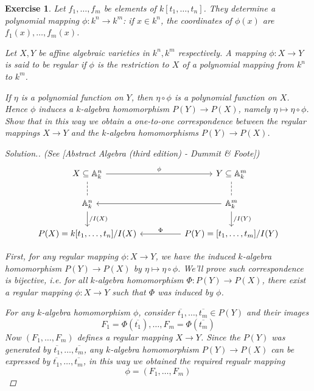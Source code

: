 \documentclass{article}
\theoremstyle{breakstyle}
\newtheorem{exercise}{Exercise}
\newenvironment{solution}
  {\begin{proof}[Solution.]\renewcommand{\qedsymbol}{}}
  {\end{proof}}
\begin{document}
\begin{exercise}
Let \(f_1,\ldots,f_m\) be elements of \(k[t_1,\ldots,t_n]\). They determine a polynomial mapping \(\phi:k^n\to k^m\): if \(x\in k^n\), the coordinates of \(\phi(x)\) are \(f_1(x),\ldots,f_m(x)\).

Let \(X,Y\) be affine algebraic varieties in \(k^n,k^m\) respectively. A mapping \(\phi:X\to Y\) is said to be regular if \(\phi\) is the restriction to \(X\) of a polynomial mapping from \(k^n\) to \(k^m\).

If \(\eta\) is a polynomial function on \(Y\), then \(\eta\circ\phi\) is a polynomial function on \(X\). Hence \(\phi\) induces a \(k\)-algebra homomorphism \(P(Y)\to P(X)\), namely \(\eta\mapsto\eta\circ\phi\). Show that in this way we obtain a one-to-one correspondence between the regular mappings \(X\to Y\) and the \(k\)-algebra homomorphisms \(P(Y)\to P(X)\).

\begin{solution}
    \emph{(See [Abstract Algebra (third edition) - Dummit \& Foote])}
        $$
        \begin{tikzcd}
        X\subseteq\mathbb{A}_k^n \arrow[rr, "\phi"] \arrow[d, no head, dashed] &  & Y\subseteq\mathbb{A}_{k}^m \arrow[d, no head, dashed] \\
        \mathbb{A}_k^n \arrow[d, "/I(X)"]                                      &  & \mathbb{A}_k^m \arrow[ll] \arrow[d, "/I(Y)"]          \\
        {P(X)=k[t_1,\dots,t_n]/I(X)}                                           &  & {P(Y)=[t_1,\dots,t_m]/I(Y)} \arrow[ll, "\Phi"']      
        \end{tikzcd}
        $$

        First, for any regular mapping $\phi:X\rightarrow Y$,
        we have the induced $k$-algebra homomorphism $P(Y)\rightarrow P(X)$ by $\eta\longmapsto \eta\circ \phi$.
        We'll prove such correspondence is bijective,
        i.e. for all $k$-algebra homomorphism $\Phi:P(Y)\rightarrow P(X)$,
        there exist a regular mapping $\phi:X\rightarrow Y$ such that $\Phi$ was induced by $\phi$.

        For any $k$-algebra homomorphism $\phi$, 
        consider $\overline{t_1},\ldots ,\overline{t_{m}}\in P(Y)$ and their images
        $$
        F_1=\Phi(\overline{t_1}),\ldots ,F_{m}=\Phi(\overline{t_{m}})
        $$
        Now $(F_1,\ldots ,F_{m})$ defines a regular mapping $X\rightarrow Y$.
        Since the $P(Y)$ was generated by $\overline{t_1},\ldots ,\overline{t_{m}}$,
        any $k$-algebra homomorphism $P(Y)\rightarrow P(X)$ can be expressed by $\overline{t_1},\ldots ,\overline{t_{m}}$,
        in this way we obtained the required regualr mapping
        $$
        \phi=(F_1,\ldots ,F_{m})
        $$
\end{solution}
\end{exercise}
\end{document}
